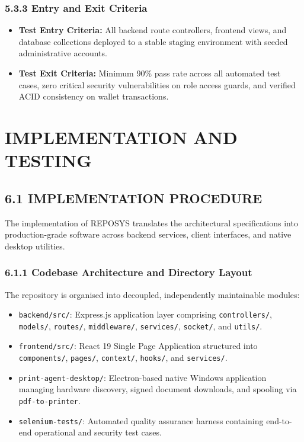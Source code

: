 \documentclass[12pt,a4paper,oneside]{report}
\begin{document}
\subsection{5.3.3 Entry and Exit Criteria}
\begin{itemize}[leftmargin=0.35in, itemsep=2pt]
  \item \textbf{Test Entry Criteria:} All backend route controllers, frontend views, and database collections deployed to a stable staging environment with seeded administrative accounts.
  \item \textbf{Test Exit Criteria:} Minimum 90\% pass rate across all automated test cases, zero critical security vulnerabilities on role access guards, and verified ACID consistency on wallet transactions.
\end{itemize}

\chapter{IMPLEMENTATION AND TESTING}

\section{6.1 IMPLEMENTATION PROCEDURE}
The implementation of REPOSYS translates the architectural specifications into production-grade software across backend services, client interfaces, and native desktop utilities.

\subsection{6.1.1 Codebase Architecture and Directory Layout}
The repository is organised into decoupled, independently maintainable modules:
\begin{itemize}[leftmargin=0.35in, itemsep=2pt]
  \item \texttt{backend/src/}: Express.js application layer comprising \texttt{controllers/}, \texttt{models/}, \texttt{routes/}, \texttt{middleware/}, \texttt{services/}, \texttt{socket/}, and \texttt{utils/}.
  \item \texttt{frontend/src/}: React 19 Single Page Application structured into \texttt{components/}, \texttt{pages/}, \texttt{context/}, \texttt{hooks/}, and \texttt{services/}.
  \item \texttt{print-agent-desktop/}: Electron-based native Windows application managing hardware discovery, signed document downloads, and spooling via \texttt{pdf-to-printer}.
  \item \texttt{selenium-tests/}: Automated quality assurance harness containing end-to-end operational and security test cases.
\end{itemize}
\end{document}
